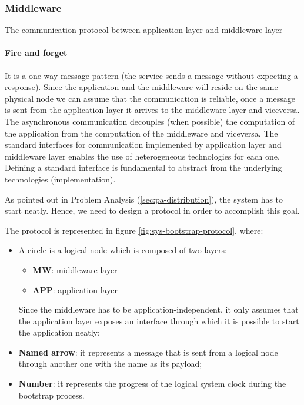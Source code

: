 \subsubsection{Middleware}
The communication protocol between application layer and middleware layer 
\paragraph{Fire and forget} 
It is a one-way message pattern (the service sends a message without expecting 
a response). Since the application and the middleware will reside on the same 
physical node we can assume that the communication is reliable, once a message 
is sent from the application layer it arrives to the middleware layer and 
viceversa. The asynchronous communication decouples (when possible) 
the computation of the application from the computation of the middleware 
and viceversa. The standard interfaces for communication 
implemented by application layer and middleware layer enables the use of 
heterogeneous technologies for each one. Defining a standard interface 
is fundamental to abstract from the underlying technologies (implementation).


As pointed out in Problem Analysis (\ref{sec:pa-distribution}), the system has
to start neatly. Hence, we need to design a protocol in order to accomplish 
this goal.

The protocol is represented in figure \ref{fig:sys-bootstrap-protocol}, where:

\begin{itemize}
  \item A circle is a logical node which is composed of two layers:
    \begin{itemize}
      \item \textbf{MW}:  middleware layer
      \item \textbf{APP}: application layer
  \end{itemize}
    Since the middleware has to be application-independent, it only assumes 
    that the application layer exposes an interface through which it is 
    possible to start the application neatly;
  \item \textbf{Named arrow}: it represents a message that is sent from a 
logical node through another one with the name as its payload;
  \item \textbf{Number}: it represents the progress of the logical system clock 
during the bootstrap process.
\end{itemize}

